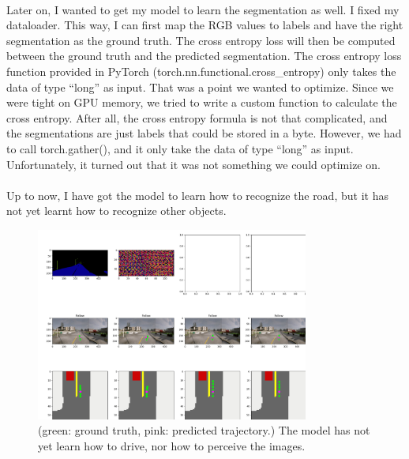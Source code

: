 \documentclass[inputenc=utf8]{ldvarticle}
\begin{document}

\noindent \\Later on, I wanted to get my model to learn the segmentation as well. I fixed my dataloader. This way, I can first map the RGB values to labels and have the right segmentation as the ground truth. The cross entropy loss will then be computed between the ground truth and the predicted segmentation. The cross entropy loss function provided in PyTorch (torch.nn.functional.cross\_entropy) only takes the data of type “long” as input. That was a point we wanted to optimize. Since we were tight on GPU memory, we tried to write a custom function to calculate the cross entropy. After all, the cross entropy formula is not that complicated, and the segmentations are just labels that could be stored in a byte. However, we had to call torch.gather(), and it only take the data of type “long” as input. Unfortunately, it turned out that it was not something we could optimize on.
\\
\noindent \\Up to now, I have got the model to learn how to recognize the road, but it has not yet learnt how to recognize other objects.
\begin{figure}[H]
  \centering
  \includegraphics[width=0.8\textwidth] {bilder/northern_pyramid_0.png} 
  \caption{(green: ground truth, pink: predicted trajectory.) The model has not yet learn how to drive, nor how to perceive the images.}
\end{figure}
\end{document}
